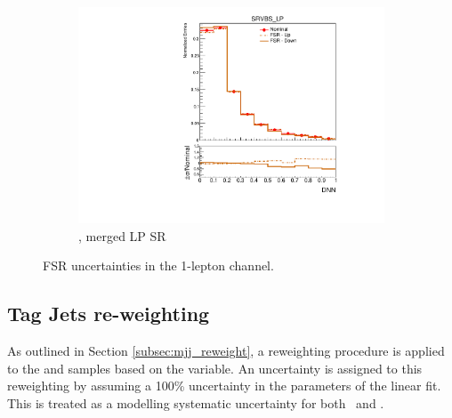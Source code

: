 \begin{figure}[p]
\begin{subfigure}[b]{0.3\textwidth}
        \includegraphics[width=\textwidth]{figures/1lep/PDFUnc/FSR/ttbar_0ptag1pfat0pjet_0ptv_SRVBS_LP_DNN_SysTheoryFSR_Top__1up_Norm.pdf}
        \caption{\ttbar, merged LP SR}
    \end{subfigure}
    \caption{FSR uncertainties in the 1-lepton channel.}
    \label{fig:fsrUnc1Lep}
\end{figure}

\clearpage
\subsection{Tag Jets re-weighting}
\label{subsec:bkg_uncer_mjjrew}

As outlined in Section \ref{subsec:mjj_reweight}, a reweighting procedure is applied to the \Wjets and \Zjets samples based on the \mjjtag variable. 
An uncertainty is assigned to this reweighting by assuming a 100\% uncertainty in the parameters of the linear fit. 
This is treated as a modelling systematic uncertainty for both \Wjets\ and \Zjets.


